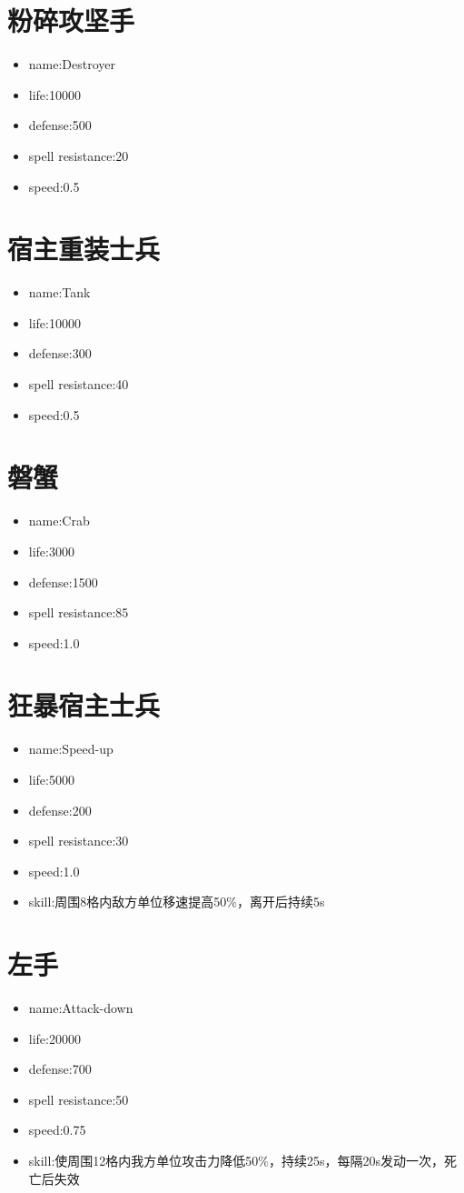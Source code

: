 \documentclass[a4paper,12pt]{article}
\begin{document}
	\section{粉碎攻坚手}
		\begin{itemize}
			\item name:Destroyer
			\item life:10000
			\item defense:500
			\item spell resistance:20
			\item speed:0.5
		\end{itemize}
	\section{宿主重装士兵}
		\begin{itemize}
			\item name:Tank
			\item life:10000
			\item defense:300
			\item spell resistance:40
			\item speed:0.5
		\end{itemize}
	\section{磐蟹}
		\begin{itemize}
			\item name:Crab
			\item life:3000
			\item defense:1500
			\item spell resistance:85
			\item speed:1.0
		\end{itemize}
	\section{狂暴宿主士兵}
		\begin{itemize}
			\item name:Speed-up
			\item life:5000
			\item defense:200
			\item spell resistance:30
			\item speed:1.0
			\item skill:周围8格内敌方单位移速提高50$\%$，离开后持续5s
		\end{itemize}
	\section{左手}
		\begin{itemize}
			\item name:Attack-down
			\item life:20000
			\item defense:700
			\item spell resistance:50
			\item speed:0.75
			\item skill:使周围12格内我方单位攻击力降低50$\%$，持续25s，每隔20s发动一次，死亡后失效
		\end{itemize}
\end{document}
